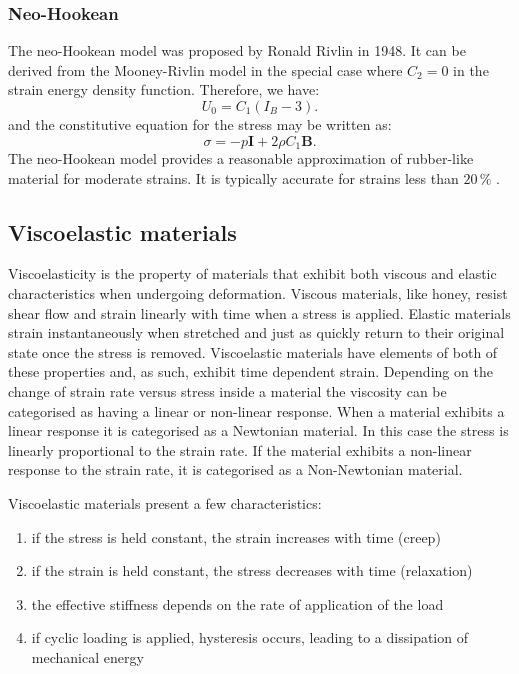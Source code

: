 	\subsubsection*{Neo-Hookean}			
The neo-Hookean model was proposed by Ronald Rivlin in 1948. It can be derived from the Mooney-Rivlin model in the special case where $C_2 = 0$ in the strain energy density function. Therefore, we have:
\begin{equation}
U_0 = C_1 (I_B-3).
\end{equation}
and the constitutive equation for the stress may be written as:
\begin{equation}
\sigma = -p \mathbf{I} + 2 \rho C_1 \mathbf{B}.
\end{equation}
The neo-Hookean model provides a reasonable approximation of rubber-like material for moderate strains.  It is typically accurate for strains less than $20\, \%$ \citep{Gent01}.
			
			
	\subsection{Viscoelastic materials}
Viscoelasticity is the property of materials that exhibit both viscous and elastic characteristics when undergoing deformation. Viscous materials, like honey, resist shear flow and strain linearly with time when a stress is applied. Elastic materials strain instantaneously when stretched and just as quickly return to their original state once the stress is removed. Viscoelastic materials have elements of both of these properties and, as such, exhibit time dependent strain. Depending on the change of strain rate versus stress inside a material the viscosity can be categorised as having a linear or non-linear response. When a material exhibits a linear response it is categorised as a Newtonian material. In this case the stress is linearly proportional to the strain rate. If the material exhibits a non-linear response to the strain rate, it is categorised as a Non-Newtonian material. 

Viscoelastic materials present a few characteristics: 
\begin{enumerate}
\item if the stress is held constant, the strain increases with time (creep)
\item if the strain is held constant, the stress decreases with time (relaxation)
\item the effective stiffness depends on the rate of application of the load
\item if cyclic loading is applied, hysteresis occurs, leading to a dissipation of mechanical energy
\end{enumerate}

